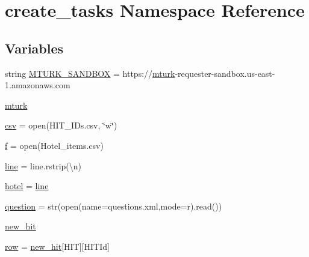 \hypertarget{namespacecreate__tasks}{}\section{create\+\_\+tasks Namespace Reference}
\label{namespacecreate__tasks}
\subsection*{Variables}
\begin{DoxyCompactItemize}
\item 
string \hyperlink{namespacecreate__tasks_ae62b2c698fe34f48fcc67433b6495a00}{M\+T\+U\+R\+K\+\_\+\+S\+A\+N\+D\+B\+OX} = \textquotesingle{}https\+://\hyperlink{namespacecreate__tasks_a5d236ec2d0fb7be80dec953c4f7564d7}{mturk}-\/requester-\/sandbox.\+us-\/east-\/1.amazonaws.\+com\textquotesingle{}
\item 
\hyperlink{namespacecreate__tasks_a5d236ec2d0fb7be80dec953c4f7564d7}{mturk}
\item 
\hyperlink{namespacecreate__tasks_a8c4ebdc20b35d7f4ede09b2cc3b26db0}{csv} = open(\textquotesingle{}H\+I\+T\+\_\+\+I\+Ds.\+csv\textquotesingle{}, \char`\"{}w\char`\"{})
\item 
\hyperlink{namespacecreate__tasks_a633de4b0c14ca52ea2432a3c8a5c4c31}{f} = open(\textquotesingle{}Hotel\+\_\+items.\+csv\textquotesingle{})
\item 
\hyperlink{namespacecreate__tasks_a4fa05b1f00fcde100685cc887554b93b}{line} = line.\+rstrip(\textquotesingle{}\textbackslash{}n\textquotesingle{})
\item 
\hyperlink{namespacecreate__tasks_a14bfea709a79fbd8d11cc6f56496c6c6}{hotel} = \hyperlink{namespacecreate__tasks_a4fa05b1f00fcde100685cc887554b93b}{line}
\item 
\hyperlink{namespacecreate__tasks_a1a1b6bd27a93f9139a2f44d01f7b3ad1}{question} = str(open(name=\textquotesingle{}questions.\+xml\textquotesingle{},mode=\textquotesingle{}r\textquotesingle{}).read())
\item 
\hyperlink{namespacecreate__tasks_ae1d9786f8e61a0b5b2060dfc938cad0a}{new\+\_\+hit}
\item 
\hyperlink{namespacecreate__tasks_ad42e2d1ad172100a2cd1338656cf0425}{row} = \hyperlink{namespacecreate__tasks_ae1d9786f8e61a0b5b2060dfc938cad0a}{new\+\_\+hit}\mbox{[}\textquotesingle{}H\+IT\textquotesingle{}\mbox{]}\mbox{[}\textquotesingle{}H\+I\+T\+Id\textquotesingle{}\mbox{]}
\end{DoxyCompactItemize}


